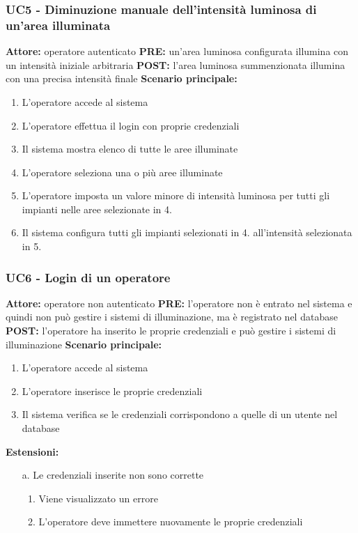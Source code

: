 \documentclass[a4paper, 12pt]{article}
\begin{document}
\subsubsection{UC5 - Diminuzione manuale dell'intensità luminosa di un'area illuminata}
\textbf{Attore:} operatore autenticato\newline
\textbf{PRE:} un'area luminosa configurata illumina con un intensità iniziale arbitraria\newline
\textbf{POST:} l'area luminosa summenzionata illumina con una precisa intensità finale\newline
\textbf{Scenario principale:}
\begin{enumerate}
    \item L'operatore accede al sistema
    \item L'operatore effettua il login con proprie credenziali
    \item Il sistema mostra elenco di tutte le aree illuminate
    \item L'operatore seleziona una o più aree illuminate
    \item L'operatore imposta un valore minore di intensità luminosa per tutti gli impianti nelle aree selezionate in 4.
    \item Il sistema configura tutti gli impianti selezionati in 4. all'intensità selezionata in 5.
\end{enumerate}

\subsubsection{UC6 - Login di un operatore}
\textbf{Attore:} operatore non autenticato\newline
\textbf{PRE:} l'operatore non è entrato nel sistema e quindi non può gestire i sistemi di illuminazione, ma è registrato nel database\newline
\textbf{POST:} l'operatore ha inserito le proprie credenziali e può gestire i sistemi di illuminazione\newline
\textbf{Scenario principale:}
\begin{enumerate}
    \item L'operatore accede al sistema
    \item L'operatore inserisce le proprie credenziali
    \item Il sistema verifica se le credenziali corrispondono a quelle di un utente nel database
\end{enumerate}
\textbf{Estensioni:}
\begin{itemize}
    \item [a.] Le credenziali inserite non sono corrette
    \begin{enumerate}
        \item Viene visualizzato un errore
        \item L'operatore deve immettere nuovamente le proprie credenziali
    \end{enumerate}
\end{itemize}
\end{document}
